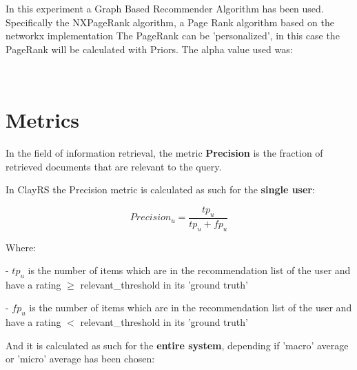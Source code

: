 \documentclass[12pt, a4paper]{article}
\begin{document}

In this experiment a Graph Based Recommender Algorithm has been used.
Specifically the NXPageRank algorithm, a Page Rank algorithm based on the networkx implementation
The PageRank can be 'personalized', in this case the PageRank will be calculated with Priors.
The alpha value used was: 




\\

\section{Metrics}




In the field of information retrieval, the metric \textbf{Precision} is the fraction
of retrieved documents that are relevant to the query.


In ClayRS the Precision metric is calculated as such for the \textbf{single user}:

    \[
    Precision_u = \frac{tp_u}{tp_u + fp_u}
    \]

    Where:

    - $tp_u$ is the number of items which are in the recommendation list of the user and have a
      rating $\geq$ relevant\_threshold in its 'ground truth'

    - $fp_u$ is the number of items which are in the recommendation list of the user and have a
      rating $<$ relevant\_threshold in its 'ground truth'



    And it is calculated as such for the \textbf{entire system}, depending if 'macro' average or 'micro' average has been
    chosen:
\end{document}
